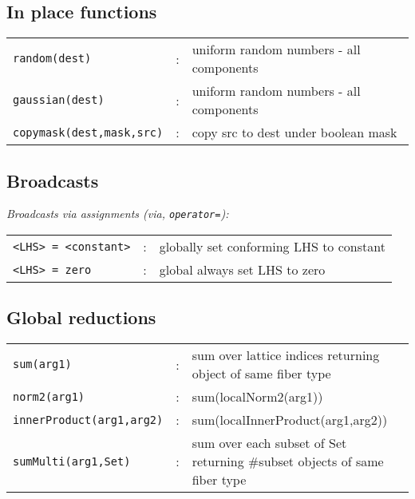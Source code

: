 \documentclass[12pt,letterpaper]{article}
\begin{document}
\subsection{In place functions}
\label{sec:inplace}

\begin{flushleft}
\begin{tabular}{lcp{4.0in}}
\verb|random(dest)|            &:& uniform random numbers - all components\\
\verb|gaussian(dest)|          &:& uniform random numbers - all components\\
\verb|copymask(dest,mask,src)| &:& copy src to dest under boolean mask\\
\end{tabular}
\end{flushleft}


\medskip

\subsection{Broadcasts}
\label{sec:broadcasts}

{\em Broadcasts via assignments (via, {\tt operator=}):}
\begin{flushleft}
\begin{tabular}{lcp{4.0in}}
\verb|<LHS> = <constant>| &:& globally set conforming LHS to constant\\
\verb|<LHS> = zero|       &:& global always set LHS to zero\\
\end{tabular}
\end{flushleft}

\medskip

\subsection{Global reductions}
\label{sec:reductions}

\begin{flushleft}
\begin{tabular}{lcp{4.0in}}
\verb|sum(arg1)|              &:& sum over lattice indices returning 
                                  object of same fiber type\\
\verb|norm2(arg1)|            &:& sum(localNorm2(arg1))\\
\verb|innerProduct(arg1,arg2)|&:& sum(localInnerProduct(arg1,arg2))\\
\verb|sumMulti(arg1,Set)|     &:& sum over each subset of Set returning \#subset
                                  objects of same fiber type\\
\end{tabular}
\end{flushleft}
\end{document}

